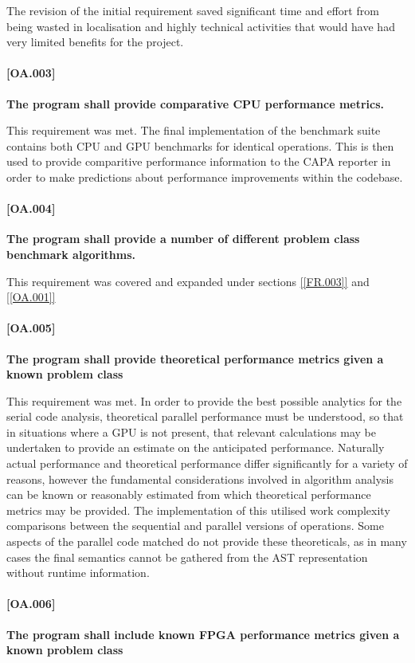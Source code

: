 The revision of the initial requirement saved significant time and effort from being wasted in
localisation and highly technical activities that would have had very limited benefits for the
project.

\paragraph{[OA.003]}
\textbf{The program shall provide comparative CPU performance metrics.}

This requirement was met. The final implementation of the benchmark suite contains both CPU and GPU
benchmarks for identical operations. This is then used to provide comparitive performance
information to the CAPA reporter in order to make predictions about performance improvements within
the codebase.

\paragraph{[OA.004]}
\textbf{The program shall provide a number of different problem class benchmark algorithms.}

This requirement was covered and expanded under sections \ref{[FR.003]} and \ref{[OA.001]}

\paragraph{[OA.005]} \label{[OA.005]}
\textbf{The program shall provide theoretical performance metrics given a known problem class}

This requirement was met. In order to provide the best possible analytics for the serial code
analysis, theoretical parallel performance must be understood, so that in situations where a GPU is
not present, that relevant calculations may be undertaken to provide an estimate on the anticipated
performance. Naturally actual performance and theoretical performance differ significantly for a
variety of reasons, however the fundamental considerations involved in algorithm analysis can be
known or reasonably estimated from which theoretical performance metrics may be provided. The
implementation of this utilised work complexity comparisons between the sequential and parallel
versions of operations.  Some aspects of the parallel code matched do not provide these
theoreticals, as in many cases the final semantics cannot be gathered from the AST representation
without runtime information.

\paragraph{[OA.006]}
\textbf{The program shall include known FPGA performance metrics given a known problem class}

